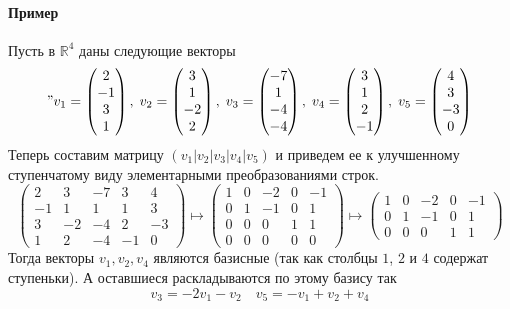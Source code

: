 \documentclass{article}
\begin{document}
\paragraph{Пример}

Пусть в $\mathbb R^4$ даны следующие векторы
\[
"v_{{1}} = \begin{pmatrix}
{2}\\
{-1}\\
{3}\\
{1}\\
\end{pmatrix},\;v_{{2}} = \begin{pmatrix}
{3}\\
{1}\\
{-2}\\
{2}\\
\end{pmatrix},\;v_{{3}} = \begin{pmatrix}
{-7}\\
{1}\\
{-4}\\
{-4}\\
\end{pmatrix},\;v_{{4}} = \begin{pmatrix}
{3}\\
{1}\\
{2}\\
{-1}\\
\end{pmatrix},\;v_{{5}} = \begin{pmatrix}
{4}\\
{3}\\
{-3}\\
{0}\\
\end{pmatrix}
\]
Теперь составим матрицу $(v_1|v_2|v_3|v_4|v_5)$ и приведем ее к улучшенному ступенчатому виду элементарными преобразованиями строк.
\[
\begin{pmatrix}
2&3&-7&3&4\\
-1&1&1&1&3\\
3&-2&-4&2&-3\\
1&2&-4&-1&0
\end{pmatrix}
\mapsto
\begin{pmatrix}
1&0&-2&0&-1\\
0&1&-1&0&1\\
0&0&0&1&1\\
0&0&0&0&0
\end{pmatrix}
\mapsto
\begin{pmatrix}
1&0&-2&0&-1\\
0&1&-1&0&1\\
0&0&0&1&1
\end{pmatrix}
\]
Тогда векторы $v_1, v_2, v_4$ являются базисные (так как столбцы $1$, $2$ и $4$ содержат ступеньки). А оставшиеся раскладываются по этому базису так
\[
v_3 = -2 v_1 - v_2\quad
v_5 = -v_1 + v_2 + v_4
\]
\end{document}
